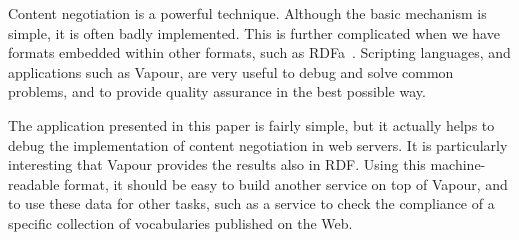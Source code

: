 \documentclass{../templates/llncs}
\begin{document}
Content negotiation is a powerful technique. Although the basic mechanism is simple,
it is often badly implemented. This is 
further complicated when we have formats embedded within other formats,
such as RDFa~\cite{Birbeck2006}. Scripting languages, and applications such as 
Vapour, are very useful to debug and solve common problems, and to provide quality 
assurance in the best possible way.


The application presented in this paper is fairly simple, but  
it actually helps to debug the implementation of content negotiation in web servers. It
is particularly interesting that Vapour provides the results also in RDF. Using this machine-readable 
format, it should be easy to build another service on top of Vapour, and to use these data for 
other tasks, such as a service to check the compliance of a specific collection 
of vocabularies published on the Web.




\end{document}
